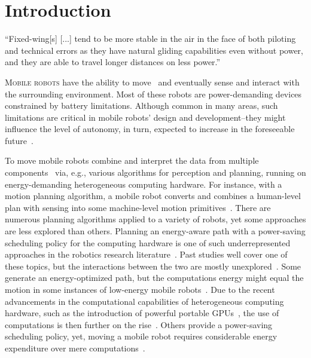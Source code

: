 
%
%
%
%
\chapter{Introduction}
\label{cp:intro}

\begin{chapquote}{\cite{wang2017curvature}}
  ``Fixed-wing[s] [...] tend to be more stable in the air in the face of both piloting and technical errors as they have natural gliding capabilities even without power, and they are able to travel longer distances on less power.''
\end{chapquote}

\vspace*{1em}

\lettrine{M}{obile robots} have the ability to move~\citep{corke2017robotics} and eventually sense and interact with the surrounding environment. Most of these robots are power-demanding devices constrained by battery limitations. Although common in many areas, such limitations are critical in mobile robots' design and development--they might influence the level of autonomy, in turn, expected to increase in the foreseeable future~\citep{fisher2013verifying}.

To move mobile robots combine and interpret the data from multiple components~\citep{mei2006deployment} via, e.g., various algorithms for perception and planning, running on energy-demanding heterogeneous computing hardware. For instance, with a motion planning algorithm, a mobile robot converts and combines a human-level plan with sensing into some machine-level motion primitives~\citep{lavalle2006planning}. There are numerous planning algorithms applied to a variety of robots, yet some approaches are less explored than others. Planning an energy-aware path with a power-saving scheduling policy for the computing hardware is one of such underrepresented approaches in the robotics research literature~\citep{sudhakar2020balancing,lahijanian2018resource,ondruska2015scheduled,brateman2006energy}. Past studies well cover one of these topics, but the interactions between the two are mostly unexplored~\citep{brateman2006energy}. Some generate an energy-optimized path, but the computations energy might equal the motion in some instances of low-energy mobile robots~\citep{sudhakar2020balancing}. Due to the recent advancements in the computational capabilities of heterogeneous computing hardware, such as the introduction of powerful portable GPUs~\citep{rizvi2017general}, the use of computations is then further on the rise~\citep{abramov2012real,satria2016real,jaramillo2019visual}. Others provide a power-saving scheduling policy, yet, moving a mobile robot requires considerable energy expenditure over mere computations~\citep{mei2004energy,mei2005case}.

